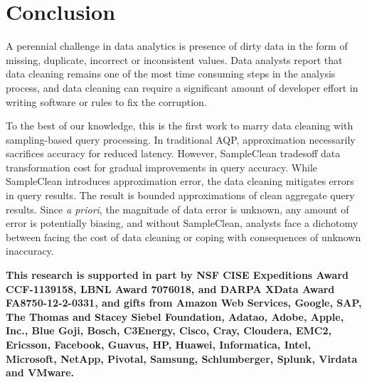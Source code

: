 \section{Conclusion}
A perennial challenge in data analytics is presence of dirty data
in the form of missing, duplicate, incorrect or inconsistent values.
Data analysts report that data cleaning remains one of the most time
consuming steps in the analysis process, and data cleaning can require
a significant amount of developer effort in writing software or rules
to fix the corruption. 

To the best of our knowledge, this is the first work to marry data cleaning with sampling-based query processing.
In traditional AQP, approximation necessarily sacrifices accuracy for reduced latency. 
However, SampleClean tradesoff data transformation cost for gradual improvements in query accuracy.
While SampleClean introduces approximation error, the data cleaning mitigates errors in query results.
The result is bounded approximations of clean aggregate query results.
Since \emph{a priori}, the magnitude of data
error is unknown, any amount of error is potentially biasing, and
without SampleClean, analysts face a dichotomy between facing the cost of data cleaning
or coping with consequences of unknown inaccuracy.

\vspace{1.5em}

\textbf{\small This research is supported in part by NSF CISE Expeditions Award CCF-1139158, LBNL Award 7076018, and DARPA XData Award FA8750-12-2-0331, and gifts from Amazon Web Services, Google, SAP, The Thomas and Stacey Siebel Foundation, Adatao, Adobe, Apple, Inc., Blue Goji, Bosch, C3Energy, Cisco, Cray, Cloudera, EMC2, Ericsson, Facebook, Guavus, HP, Huawei, Informatica, Intel, Microsoft, NetApp, Pivotal, Samsung, Schlumberger, Splunk, Virdata and VMware.}